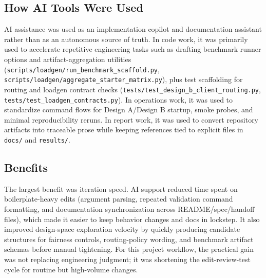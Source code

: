 \documentclass[11pt]{article}
\begin{document}
\subsection{How AI Tools Were Used}
AI assistance was used as an implementation copilot and documentation assistant rather than as an autonomous source of truth.
In code work, it was primarily used to accelerate repetitive engineering tasks such as drafting benchmark runner options and artifact-aggregation utilities (\texttt{scripts/loadgen/run\_benchmark\_scaffold.py}, \texttt{scripts/loadgen/aggregate\_starter\_matrix.py}), plus test scaffolding for routing and loadgen contract checks (\texttt{tests/test\_design\_b\_client\_routing.py}, \texttt{tests/test\_loadgen\_contracts.py}).
In operations work, it was used to standardize command flows for Design A/Design B startup, smoke probes, and minimal reproducibility reruns.
In report work, it was used to convert repository artifacts into traceable prose while keeping references tied to explicit files in \texttt{docs/} and \texttt{results/}.

\subsection{Benefits}
The largest benefit was iteration speed.
AI support reduced time spent on boilerplate-heavy edits (argument parsing, repeated validation command formatting, and documentation synchronization across README/spec/handoff files), which made it easier to keep behavior changes and docs in lockstep.
It also improved design-space exploration velocity by quickly producing candidate structures for fairness controls, routing-policy wording, and benchmark artifact schemas before manual tightening.
For this project workflow, the practical gain was not replacing engineering judgment; it was shortening the edit-review-test cycle for routine but high-volume changes.
\end{document}
